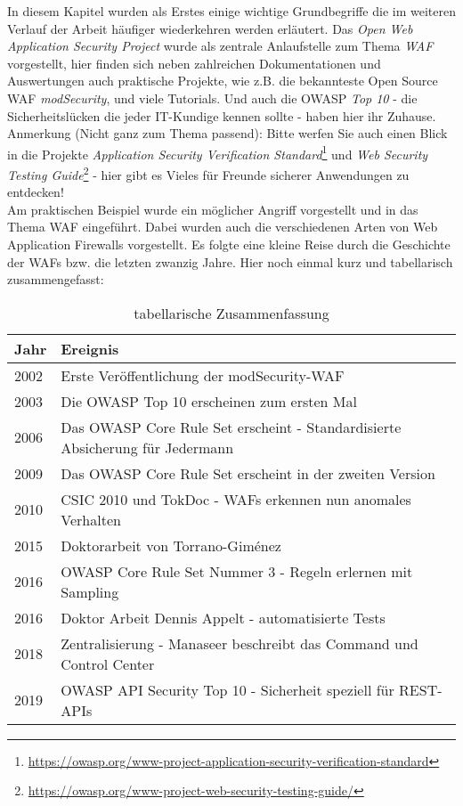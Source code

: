 In diesem Kapitel wurden als Erstes einige wichtige Grundbegriffe die im weiteren Verlauf der Arbeit häufiger wiederkehren werden erläutert. Das \emph{Open Web Application Security Project} wurde als zentrale Anlaufstelle zum Thema \emph{WAF} vorgestellt, hier finden sich neben zahlreichen Dokumentationen und Auswertungen auch praktische Projekte, wie z.B. die bekannteste Open Source WAF \emph{modSecurity}, und viele Tutorials. Und auch die OWASP \emph{Top 10} - die Sicherheitslücken die jeder IT-Kundige kennen sollte - haben hier ihr Zuhause. \\

\textcolor{bhtGray}{ Anmerkung (Nicht ganz zum Thema passend):} Bitte werfen Sie auch einen Blick in die Projekte \emph{Application Security Verification Standard}\footnote{\url{https://owasp.org/www-project-application-security-verification-standard}} und \emph{Web Security Testing Guide}\footnote{\url{https://owasp.org/www-project-web-security-testing-guide/}} - hier gibt es Vieles für Freunde sicherer Anwendungen zu entdecken! \\

Am praktischen Beispiel wurde ein möglicher Angriff vorgestellt und in das Thema WAF eingeführt. Dabei wurden auch die verschiedenen Arten von Web Application Firewalls vorgestellt. Es folgte eine kleine Reise durch die Geschichte der WAFs bzw. die letzten zwanzig Jahre. Hier noch einmal kurz und tabellarisch zusammengefasst:\\

\begin{table}[h]
    \centering
 
\begin{tabular}{lp{9cm}}
  \toprule
  Jahr & Ereignis\\
  \midrule
  2002 & Erste Veröffentlichung der modSecurity-WAF \\
  2003 & Die OWASP Top 10 erscheinen zum ersten Mal\\
  2006 & Das OWASP Core Rule Set erscheint - Standardisierte Absicherung für Jedermann \\
  2009 & Das OWASP Core Rule Set erscheint in der zweiten Version \\
  2010 & CSIC 2010 und TokDoc - WAFs erkennen nun anomales Verhalten \\
  2015 & Doktorarbeit von Torrano-Giménez \\
  2016 & OWASP Core Rule Set Nummer 3 - Regeln erlernen mit Sampling \\
  2016 & Doktor Arbeit Dennis Appelt - automatisierte Tests \\
  2018 & Zentralisierung - Manaseer beschreibt das Command und Control Center\\
  2019 & OWASP API Security Top 10 - Sicherheit speziell für REST-APIs\\
  \bottomrule
\end{tabular}
\caption{tabellarische Zusammenfassung}
\label{tab:zeitstrahl}
\end{table}

